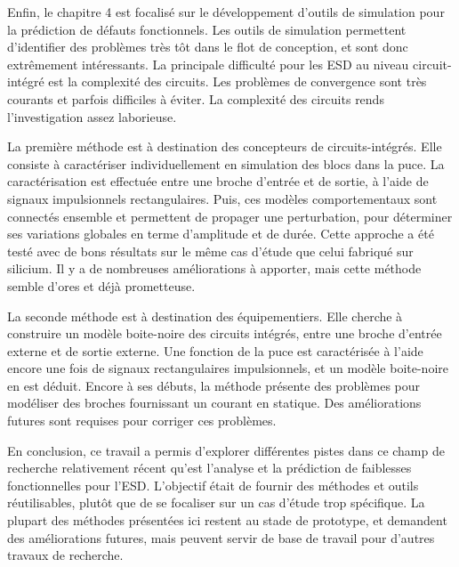Enfin, le chapitre 4 est focalisé sur le développement d'outils de simulation pour la prédiction de défauts fonctionnels.
Les outils de simulation permettent d'identifier des problèmes très tôt dans le flot de conception, et sont donc extrêmement intéressants.
La principale difficulté pour les ESD au niveau circuit-intégré est la complexité des circuits.
Les problèmes de convergence sont très courants et parfois difficiles à éviter.
La complexité des circuits rends l'investigation assez laborieuse.

La première méthode est à destination des concepteurs de circuits-intégrés.
Elle consiste à caractériser individuellement en simulation des blocs dans la puce.
La caractérisation est effectuée entre une broche d'entrée et de sortie, à l'aide de signaux impulsionnels rectangulaires.
Puis, ces modèles comportementaux sont connectés ensemble et permettent de propager une perturbation, pour déterminer ses variations globales en terme d'amplitude et de durée.
Cette approche a été testé avec de bons résultats sur le même cas d'étude que celui fabriqué sur silicium.
Il y a de nombreuses améliorations à apporter, mais cette méthode semble d'ores et déjà prometteuse.

La seconde méthode est à destination des équipementiers.
Elle cherche à construire un modèle boite-noire des circuits intégrés, entre une broche d'entrée externe et de sortie externe.
Une fonction de la puce est caractérisée à l'aide encore une fois de signaux rectangulaires impulsionnels, et un modèle boite-noire en est déduit.
Encore à ses débuts, la méthode présente des problèmes pour modéliser des broches fournissant un courant en statique.
Des améliorations futures sont requises pour corriger ces problèmes.

En conclusion, ce travail a permis d'explorer différentes pistes dans ce champ de recherche relativement récent qu'est l'analyse et la prédiction de faiblesses fonctionnelles pour l'ESD.
L'objectif était de fournir des méthodes et outils réutilisables, plutôt que de se focaliser sur un cas d'étude trop spécifique.
La plupart des méthodes présentées ici restent au stade de prototype, et demandent des améliorations futures, mais peuvent servir de base de travail pour d'autres travaux de recherche.

